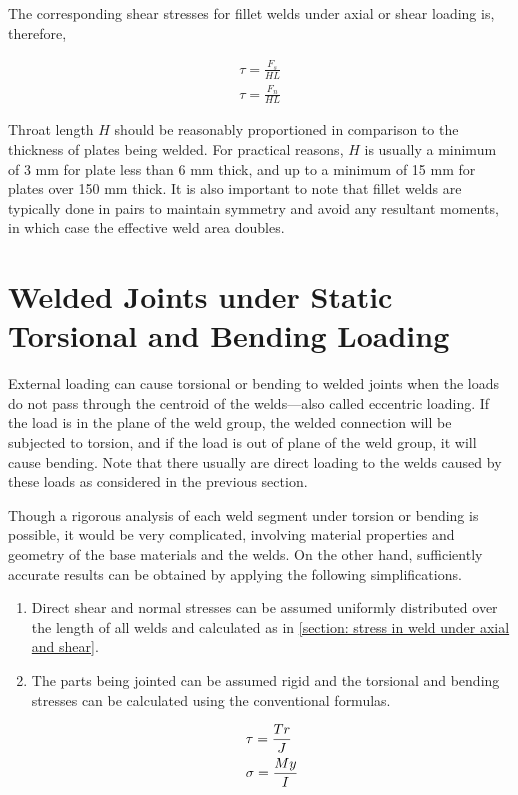 \documentclass[
10pt,
a4paper,
openany,
svgnames,
]{book}
\begin{document}
The corresponding shear stresses for fillet welds under axial or shear loading is, therefore,

\begin{equation}
  \begin{gathered}
    \tau = \frac{F_s}{HL} \\
    \tau = \frac{F_n}{HL}
  \end{gathered}
\end{equation}

Throat length $H$ should be reasonably proportioned in comparison to the thickness of plates being welded. For practical reasons, $H$ is usually a minimum of 3 mm for plate less than 6 mm thick, and up to a minimum of 15 mm for plates over 150 mm thick. It is also important to note that fillet welds are typically done in pairs to maintain symmetry and avoid any resultant moments, in which case the effective weld area doubles.

\section{Welded Joints under Static Torsional and Bending Loading}
\label{section: weld joints under torsion and bending}

External loading can cause torsional or bending to welded joints when the loads do not pass through the centroid of the welds—also called eccentric loading. If the load is in the plane of the weld group, the welded connection will be subjected to torsion, and if the load is out of plane of the weld group, it will cause bending. Note that there usually are direct loading to the welds caused by these loads as considered in the previous section.

Though a rigorous analysis of each weld segment under torsion or bending is possible, it would be very complicated, involving material properties and geometry of the base materials and the welds. On the other hand, sufficiently accurate results can be obtained by applying the following simplifications.
\begin{enumerate}
\item Direct shear and normal stresses can be assumed uniformly distributed over the length of all welds and calculated as in \cref{section: stress in weld under axial and shear}.
\item The parts being jointed can be assumed rigid and the torsional and bending stresses can be calculated using the conventional formulas.
  
  \[\begin{gathered}
    \tau  = \frac{Tr}{J} \hfill \\
    \sigma  = \frac{My}{I} \hfill \\ 
  \end{gathered} \]

\end{enumerate}
\end{document}
